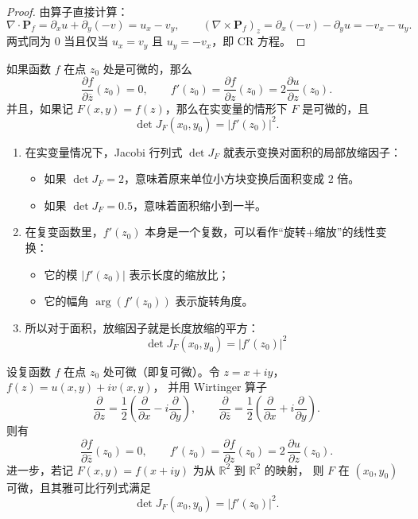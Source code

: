 \documentclass[lang=cn,10pt]{elegantbook}
\begin{document}
\begin{proof}
由算子直接计算：
\[
\nabla\!\cdot\!\mathbf P_f=\partial_x u+\partial_y(-v)=u_x-v_y,\qquad
(\nabla\!\times\!\mathbf P_f)_z=\partial_x(-v)-\partial_y u=-v_x-u_y.
\]
两式同为 $0$ 当且仅当 $u_x=v_y$ 且 $u_y=-v_x$，即 CR 方程。
\end{proof}
\begin{theorem}[命题 2.3]
如果函数 $f$ 在点 $z_{0}$ 处是可微的，那么
\[
\frac{\partial f}{\partial \overline{z}}(z_{0}) = 0, 
\qquad 
f'(z_{0}) = \frac{\partial f}{\partial z}(z_{0}) = 2\frac{\partial u}{\partial z}(z_{0}).
\]
并且，如果记 $F(x,y) = f(z)$，那么在实变量的情形下 $F$ 是可微的，且
\[
\det J_{F}(x_{0},y_{0}) = \bigl| f'(z_{0}) \bigr|^{2}.
\]
\end{theorem}
\begin{dxtips}[行列式是基向量组成的矩体的缩放比例]
\begin{enumerate}
  \item 在实变量情况下，Jacobi 行列式 $\det J_F$ 就表示变换对面积的局部放缩因子：
  \begin{itemize}
    \item 如果 $\det J_F = 2$，意味着原来单位小方块变换后面积变成 $2$ 倍。
    \item 如果 $\det J_F = 0.5$，意味着面积缩小到一半。
  \end{itemize}

  \item 在复变函数里，$f'(z_0)$ 本身是一个复数，可以看作“旋转+缩放”的线性变换：
  \begin{itemize}
    \item 它的模 $|f'(z_0)|$ 表示长度的缩放比；
    \item 它的幅角 $\arg(f'(z_0))$ 表示旋转角度。
  \end{itemize}

  \item 所以对于面积，放缩因子就是长度放缩的平方：
  \[
    \det J_F(x_0,y_0) = |f'(z_0)|^2
  \]
  
\end{enumerate}

\end{dxtips}
\begin{theorem}
设复函数 $f$ 在点 $z_0$ 处可微（即复可微）。令 $z=x+iy$，$f(z)=u(x,y)+iv(x,y)$，
并用 Wirtinger 算子
\[
\frac{\partial}{\partial z}=\frac12\!\left(\frac{\partial}{\partial x}-i\frac{\partial}{\partial y}\right),
\qquad
\frac{\partial}{\partial \bar z}=\frac12\!\left(\frac{\partial}{\partial x}+i\frac{\partial}{\partial y}\right).
\]
则有
\[
\frac{\partial f}{\partial \bar z}(z_0)=0,
\qquad
f'(z_0)=\frac{\partial f}{\partial z}(z_0)
=2\,\frac{\partial u}{\partial z}(z_0).
\]
进一步，若记 $F(x,y)=f(x+iy)$ 为从 $\mathbb{R}^2$ 到 $\mathbb{R}^2$ 的映射，
则 $F$ 在 $(x_0,y_0)$ 可微，且其雅可比行列式满足
\[
\det J_{F}(x_0,y_0)=\bigl|f'(z_0)\bigr|^2 .
\]
\end{theorem}
\end{document}
